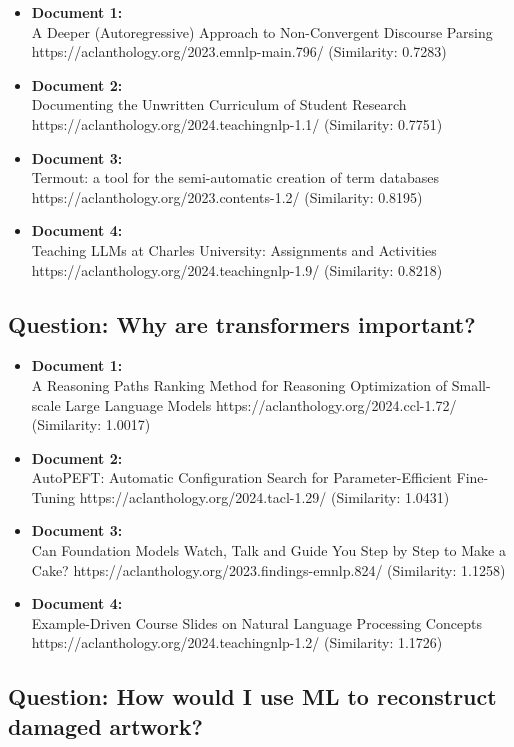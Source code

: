 \documentclass[fleqn,moreauthors,10pt]{ds_report}
\begin{document}
\begin{itemize}
  \item \textbf{Document 1:} \\
  A Deeper (Autoregressive) Approach to Non-Convergent Discourse Parsing https://aclanthology.org/2023.emnlp-main.796/ (Similarity: 0.7283)
  \item \textbf{Document 2:} \\
  Documenting the Unwritten Curriculum of Student Research https://aclanthology.org/2024.teachingnlp-1.1/ (Similarity: 0.7751)
  \item \textbf{Document 3:} \\
  Termout: a tool for the semi-automatic creation of term databases https://aclanthology.org/2023.contents-1.2/ (Similarity: 0.8195)
  \item \textbf{Document 4:} \\
  Teaching LLMs at Charles University: Assignments and Activities https://aclanthology.org/2024.teachingnlp-1.9/ (Similarity: 0.8218)
\end{itemize}

\subsection*{Question: Why are transformers important?}

\begin{itemize}
  \item \textbf{Document 1:} \\
  A Reasoning Paths Ranking Method for Reasoning Optimization of Small-scale Large Language Models https://aclanthology.org/2024.ccl-1.72/ (Similarity: 1.0017)
  \item \textbf{Document 2:} \\
  AutoPEFT: Automatic Configuration Search for Parameter-Efficient Fine-Tuning https://aclanthology.org/2024.tacl-1.29/ (Similarity: 1.0431)
  \item \textbf{Document 3:} \\
  Can Foundation Models Watch, Talk and Guide You Step by Step to Make a Cake? https://aclanthology.org/2023.findings-emnlp.824/ (Similarity: 1.1258)
  \item \textbf{Document 4:} \\
  Example-Driven Course Slides on Natural Language Processing Concepts https://aclanthology.org/2024.teachingnlp-1.2/ (Similarity: 1.1726)
\end{itemize}

\subsection*{Question: How would I use ML to reconstruct damaged artwork?}
\end{document}

